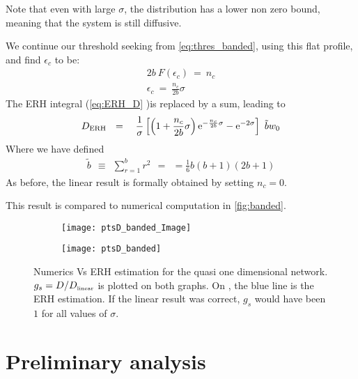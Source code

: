 Note that even with large $\sigma$, the distribution has a lower non zero bound, meaning that the system is still diffusive.


We continue our threshold seeking from \autoref{eq:thres_banded}, using this 
flat profile, and find $\epsilon_c$ to be:
%
\begin{align}
2b\ F(\epsilon_c) \ =\ n_c \\
\epsilon_c\ = \ \frac{n_c}{2b}\sigma
\end{align}
%
The ERH integral (\autoref{eq:ERH_D} )is replaced by a sum, leading to
\begin{align}
D_{\text{ERH}} \ \ = \ \ 
\ \frac{1}{\sigma}\left[ 
\left(1+\frac{n_c}{2b}\sigma\right)\eexp{-\frac{n_c}{2b}\sigma} - \eexp{-2\sigma}
\right] \ \tilde{b} w_0
\end{align}
Where we have defined
%
\begin{align}
\tilde{b} \ \ \equiv \ \ \sum_{r=1}^b r^2 \ \ = \ \ = \frac{1}{6}b(b+1)(2b+1)
\end{align}
%
As before, the linear result is formally obtained by setting $n_c=0$.

This result is compared to numerical computation in \autoref{fig:banded}.

\begin{figure}
\begin{subfigure}{0.49\textwidth}
\texttt{[image: ptsD\_banded\_Image]}
\label{fig:band_image}
\end{subfigure}
\begin{subfigure}{0.49\textwidth}
\texttt{[image: ptsD\_banded]}
\label{fig:band_b10}
\end{subfigure}
\caption[Banded network]{Numerics Vs ERH estimation for the quasi one dimensional network. $g_s = D/D_{\mbox{\tiny linear}}$ is plotted on both graphs.
On \subref{fig:band_b10}, the blue line is the ERH estimation. If the
linear result was correct, $g_s$ would have been $1$ for all values of $\sigma$.}
\label{fig:banded}
\end{figure}




\chapter{Preliminary analysis}

